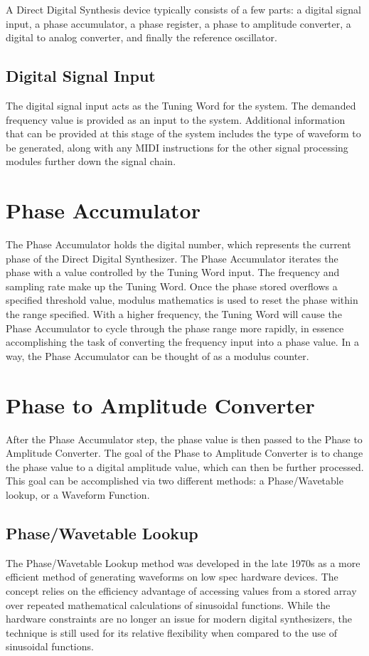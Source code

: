 \documentclass[a4paper,12pt]{report}
\begin{document}
A Direct Digital Synthesis device typically consists of a few parts: a digital signal input, a phase accumulator, a phase register, a phase to amplitude converter, a digital to analog converter, and finally the reference oscillator.

\subsection{Digital Signal Input}
\label{subsec:digitalsignalinput}
The digital signal input acts as the Tuning Word for the system. The demanded frequency value is provided as an input to the system. Additional information that can be provided at this stage of the system includes the type of waveform to be generated, along with any MIDI instructions for the other signal processing modules further down the signal chain.

\section{Phase Accumulator}
\label{sec:phaseaccu}
The Phase Accumulator holds the digital number, which represents the current phase of the Direct Digital Synthesizer. The Phase Accumulator iterates the phase with a value controlled by the Tuning Word input. The frequency and sampling rate make up the Tuning Word. Once the phase stored overflows a specified threshold value, modulus mathematics is used to reset the phase within the range specified. With a higher frequency, the Tuning Word will cause the Phase Accumulator to cycle through the phase range more rapidly, in essence accomplishing the task of converting the frequency input into a phase value. In a way, the Phase Accumulator can be thought of as a modulus counter.

\section{Phase to Amplitude Converter}
\label{sec:phasetoamplitudeconverter}
After the Phase Accumulator step, the phase value is then passed to the Phase to Amplitude Converter. The goal of the Phase to Amplitude Converter is to change the phase value to a digital amplitude value, which can then be further processed. This goal can be accomplished via two different methods: a Phase/Wavetable lookup, or a Waveform Function.

\subsection{Phase/Wavetable Lookup}
\label{subsec:phasewavetablelookup}
The Phase/Wavetable Lookup method was developed in the late 1970s as a more efficient method of generating waveforms on low spec hardware devices. The concept relies on the efficiency advantage of accessing values from a stored array over repeated mathematical calculations of sinusoidal functions. While the hardware constraints are no longer an issue for modern digital synthesizers, the technique is still used for its relative flexibility when compared to the use of sinusoidal functions.
\end{document}
